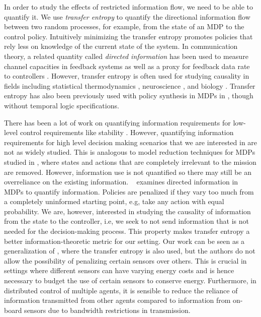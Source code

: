 In order to study the effects of restricted information flow, we need to be able to quantify it. We use \emph{transfer entropy} \cite{schreiber2000} to quantify the directional information flow between two random processes, for example, from the state of an MDP to the control policy. Intuitively minimizing the transfer entropy promotes policies that rely less on knowledge of the current state of the system. In communication theory, a related quantity called \emph{directed information} has been used to measure channel capacities in feedback systems \cite{massey1990causality,tatikonda2009capacity} as well as a proxy for feedback data rate to controllers \cite{silva2011achievable}. However, transfer entropy is often used for studying causality in fields including statistical thermodynamics \cite{parrondo2015thermodynamics}, neuroscience \cite{vicente2011transfer}, and biology \cite{tung2007inferring}. Transfer entropy has also been previously used with policy synthesis in MDPs in \cite{takashi17}, though without temporal logic specifications. 

There has been a lot of work on quantifying information requirements for low-level control requirements like stability \cite{Nair07}. However, quantifying information requirements for high level decision making scenarios that we are interested in are not as widely studied. This is analogous to model reduction techniques for MDPs studied in \cite{Bharadwaj17,brazdil2014verification,ciesinski2008reduction}, where states and actions that are completely irrelevant to the mission are removed. However, information use is not quantified so there may still be an overreliance on the existing information. ~\cite{Tishby2011} examines directed information in MDPs to quantify information. Policies are penalized if they vary too much from a completely uninformed starting point, e.g, take any action with equal probability. We are, however, interested in studying the causality of information from the state to the controller, i.e, we seek to not send information that is not needed for the decision-making process. This property makes transfer entropy a better information-theoretic metric for our setting. Our work can be seen as a generalization of \cite{takashi17}, where the transfer entropy is also used, but the authors do not allow the possibility of penalizing certain sensors over others. This is crucial in settings where different sensors can have varying energy costs and is hence necessary to budget the use of certain sensors to conserve energy. Furthermore, in distributed control of multiple agents, it is sensible to reduce the reliance of information transmitted from other agents compared to information from on-board sensors due to bandwidth restrictions in transmission.

